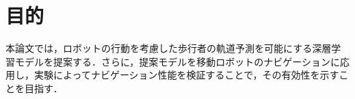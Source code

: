 
\section{目的}


本論文では，ロボットの行動を考慮した歩行者の軌道予測を可能にする深層学習モデルを提案する．さらに，提案モデルを移動ロボットのナビゲーションに応用し，実験によってナビゲーション性能を検証することで，その有効性を示すことを目指す．

